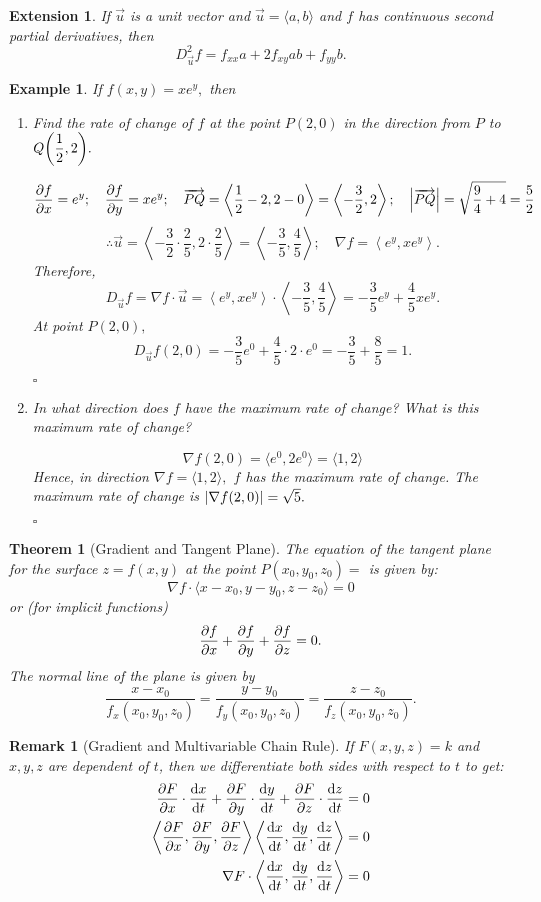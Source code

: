 \documentclass[12pt,a4paper]{article}
\newtheorem{thm}{Theorem}[subsection]
\newtheorem{eg}{Example}[subsection]
\newenvironment*{ans}{\par\indent{\textit{Answer. }}\par}{\par\hfill{$\square$}\par}
\newtheorem*{rmk}{\indent Remark}
\newtheorem*{ext}{\indent Extension}
\def\vecu{\vec{u}}
\begin{document}
\begin{ext}
	If $\vecu$ is a unit vector and $\vecu=\langle a,b\rangle$ and $f$ has continuous second partial derivatives, then \[D_{\vecu}^2f=f_{xx}a+2f_{xy}ab+f_{yy}b.\]	
\end{ext}
\begin{eg}
	If $f(x,y)=xe^y,$ then
	\begin{enumerate}
		\item Find the rate of change of $f$ at the point $P(2,0)$ in the direction from $P$ to $Q\qty(\dfrac{1}{2},2).$
		\begin{ans}
			\[\pdv{f}{x}=e^y;\quad\pdv{f}{y}=xe^y;\quad\overrightarrow{PQ}=\left\langle\frac{1}{2}-2,2-0\right\rangle=\left\langle-\frac{3}{2},2\right\rangle;\quad\qty|\overrightarrow{PQ}|=\sqrt{\frac{9}{4}+4}=\frac{5}{2}\]\[\therefore\vecu=\left\langle-\frac{3}{2}\cdot\frac{2}{5},2\cdot\frac{2}{5}\right\rangle=\left\langle-\frac{3}{5},\frac{4}{5}\right\rangle;\quad\nabla f=\left\langle e^y,xe^y\right\rangle.\]Therefore, \[D_{\vecu}f=\nabla f\cdot\vecu=\left\langle e^y,xe^y\right\rangle\cdot\left\langle-\frac{3}{5},\frac{4}{5}\right\rangle=-\frac{3}{5}e^y+\frac{4}{5}xe^y.\] At point $P(2,0),$ \[D_{\vecu}f(2,0)=-\frac{3}{5}e^0+\frac{4}{5}\cdot2\cdot e^0=-\frac{3}{5}+\frac{8}{5}=1.\]
		\end{ans}
		\item In what direction does $f$ have the maximum rate of change? What is this maximum rate of change?
		\begin{ans}
			\[\nabla f(2,0)=\langle e^0,2e^0\rangle=\langle1,2\rangle\] Hence, in direction $\nabla f=\langle1,2\rangle,$ $f$ has the maximum rate of change. The maximum rate of change is $\qty|\nabla f(2,0)|=\sqrt{5}.$
		\end{ans}
	\end{enumerate}
\end{eg}
\begin{thm}[Gradient and Tangent Plane]
	The equation of the tangent plane for the surface $z=f(x,y)$ at the point $P(x_0,y_0,z_0) =$ is given by: \[\nabla f\cdot\langle x-x_0,y-y_0,z-z_0\rangle=0\] or (for implicit functions) \[\pdv{f}{x} (x-x_0)+\pdv{f}{y} (y-y_0)+\pdv{f}{z} (z-z_0)=0.\]	The normal line of the plane is given by \[\frac{x-x_0}{f_x(x_0,y_0,z_0)}=\frac{y-y_0}{f_y(x_0,y_0,z_0)}=\frac{z-z_0}{f_z(x_0,y_0,z_0)}.\]
\end{thm}
\begin{rmk}[Gradient and Multivariable Chain Rule]
	If $F(x,y,z)=k$ and $x,y,z$ are dependent of $t$, then we differentiate both sides with respect to $t$ to get:\[\begin{aligned}\pdv{F}{x}\cdot\dv{x}{t}+\pdv{F}{y}\cdot\dv{y}{t}+\pdv{F}{z}\cdot\dv{z}{t}&=0\\\left\langle\pdv{F}{x},\pdv{F}{y},\pdv{F}{z}\right\rangle\left\langle\dv{x}{t},\dv{y}{t},\dv{z}{t}\right\rangle&=0\\\nabla F\cdot\left\langle\dv{x}{t},\dv{y}{t},\dv{z}{t}\right\rangle&=0\end{aligned}\]	
\end{rmk}
\end{document}

